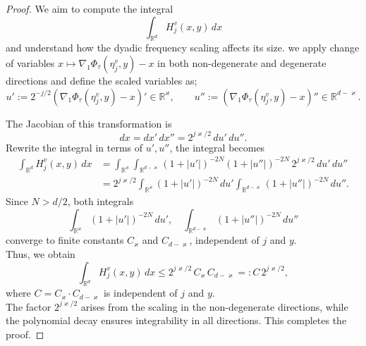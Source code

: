 \documentclass[12pt, reqno]{amsart}
\theoremstyle{definition}
\theoremstyle{remark}
\numberwithin{equation}{section}
\begin{document}
\begin{proof}
We aim to compute the integral
\[
\int_{\mathbb{R}^d} H^v_j(x,y) \, dx
\]
and understand how the dyadic frequency scaling affects its size. 
  we apply change of variables $x\mapsto \nabla_1 \Phi_\tau(\eta_j^v,y) - x$ in both non-degenerate and degenerate directions and define the scaled variables as;
\[
u' := 2^{-j/2} (\nabla_1 \Phi_\tau(\eta_j^v,y) - x)' \in \mathbb{R}^\varkappa, 
\qquad
u'' := (\nabla_1 \Phi_\tau(\eta_j^v,y) - x)'' \in \mathbb{R}^{d-\varkappa}.
\]

The Jacobian of this transformation is
\[
dx = dx' \, dx'' = 2^{j \varkappa/2} \, du' \, du''.
\]
 Rewrite the integral in terms of $u', u''$, the integral becomes
\[
\begin{aligned}
\int_{\mathbb{R}^d} H^v_j(x,y) \, dx 
&= \int_{\mathbb{R}^\varkappa} \int_{\mathbb{R}^{d-\varkappa}} 
(1 + |u'|)^{-2N} (1 + |u''|)^{-2N} \, 2^{j \varkappa/2} \, du' \, du'' \\
&= 2^{j \varkappa/2} \int_{\mathbb{R}^{\varkappa}} (1 + |u'|)^{-2N} \, du' 
      \int_{\mathbb{R}^{d-\varkappa}} (1 + |u''|)^{-2N} \, du''.
\end{aligned}
\]
Since \(N > d/2\), both integrals
\[
\int_{\mathbb{R}^{\varkappa}} (1 + |u'|)^{-2N} \, du', 
\quad 
\int_{\mathbb{R}^{d-\varkappa}} (1 + |u''|)^{-2N} \, du''
\]
converge to finite constants $C_\varkappa$ and $C_{d-\varkappa}$, independent of \(j\) and \(y\).\\
Thus, we obtain
\[
\int_{\mathbb{R}^d} H^v_j(x,y) \, dx \le 2^{j \varkappa/2} \, C_\varkappa \, C_{d-\varkappa} =: C \, 2^{j \varkappa/2},
\]
where \(C = C_\varkappa \cdot C_{d-\varkappa}\) is independent of \(j\) and \(y\).\\
The factor \(2^{j \varkappa/2}\) arises from the scaling in the non-degenerate directions, while the polynomial decay ensures integrability in all directions. This completes the proof.
\end{proof}
\end{document}
